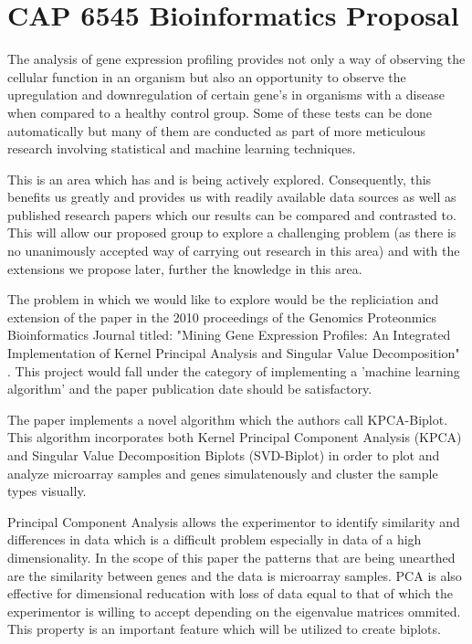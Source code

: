 \documentclass[10pt,a4,oneside]{report}
\begin{document}
\section*{CAP 6545 Bioinformatics Proposal}

The analysis of gene expression profiling provides not only a way of observing the cellular function in an organism but also an opportunity to observe the upregulation and downregulation of certain gene's in organisms with a disease  when compared to a healthy control group. Some of these tests can be done automatically but many of them are conducted as part of more meticulous  research involving statistical and machine learning techniques.

This is an area which has and is being actively explored. Consequently, this benefits us greatly and provides us with readily available data sources as well as published research papers which our results can be compared and contrasted to. This will allow our proposed group to explore a challenging problem (as there is no unanimously accepted way of carrying out research in this area) and with the extensions we propose later, further the knowledge in this area.

The problem in which we would like to explore would be the repliciation and extension of the paper in the 2010 proceedings of the
Genomics Proteonmics Bioinformatics Journal titled: "Mining Gene Expression Profiles: An Integrated Implementation of Kernel Principal
Analysis and Singular Value Decomposition" \cite{Reverter2010200}. This project would fall under the category of implementing a 'machine
learning algorithm' and the paper publication date should be satisfactory.

The paper implements a novel algorithm which the authors call KPCA-Biplot. This algorithm incorporates both Kernel Principal Component Analysis (KPCA) and Singular Value Decomposition Biplots (SVD-Biplot) in order to plot and analyze microarray samples and genes simulatenously and cluster the sample types visually. %

Principal Component Analysis  allows the experimentor to identify similarity and differences in data which is a difficult problem especially in data of a high dimensionality. In the scope of this paper the patterns that are being unearthed are the similarity between genes and the data is microarray samples. PCA is also effective for dimensional reducation with loss of data equal to that of which the experimentor is willing to accept depending on the eigenvalue matrices ommited. This property is an important feature which will be utilized to create biplots.
\end{document}
